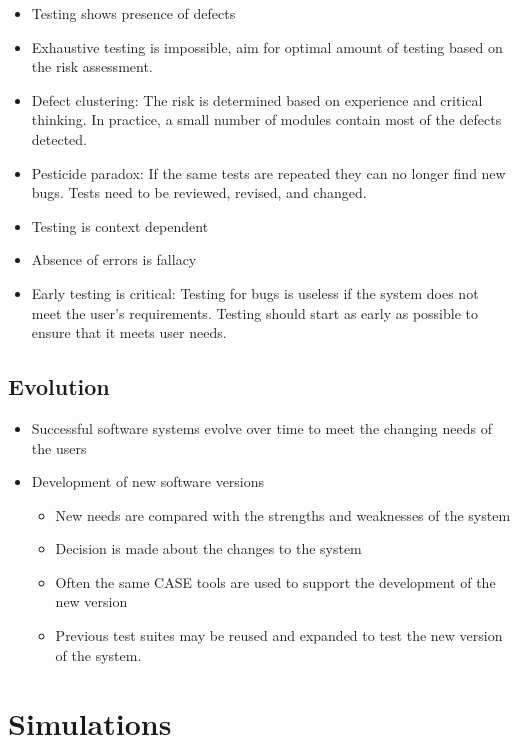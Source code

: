 \documentclass{article}
\begin{document}
\begin{itemize}
  \item Testing shows presence of defects
  \item Exhaustive testing is impossible, aim for optimal amount of testing based on the risk assessment.
  \item Defect clustering: The risk is determined based on experience and critical thinking. In practice, a small number of modules contain most of the defects detected.
  \item Pesticide paradox: If the same tests are repeated they can no longer find new bugs. Tests need to be reviewed, revised, and changed.
  \item Testing is context dependent
  \item Absence of errors is fallacy 
  \item Early testing is critical: Testing for bugs is useless if the system does not meet the user’s requirements. Testing should start as early as possible to ensure that it meets user needs.
\end{itemize}

\subsection{Evolution}

\begin{itemize}
  \item Successful software systems evolve over time to meet the changing needs of the users
  \item Development of new software versions
  \begin{itemize}
    \item New needs are compared with the strengths and weaknesses of the system 
    \item Decision is made about the changes to the system 
    \item Often the same CASE tools are used to support the development of the new version 
    \item Previous test suites may be reused and expanded to test the new version of the system.
    \end{itemize}  
\end{itemize}

\section{Simulations}
\end{document}

